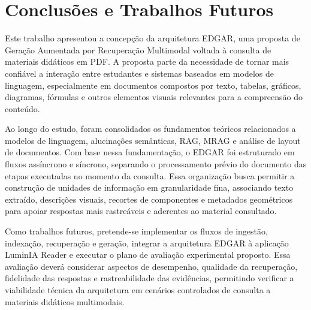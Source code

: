 \chapter{Conclusões e Trabalhos Futuros}
\label{chap:conclusoes-e-trabalhos-futuros}

Este trabalho apresentou a concepção da arquitetura EDGAR, uma proposta de Geração Aumentada por Recuperação Multimodal voltada à consulta de materiais didáticos em PDF. A proposta parte da necessidade de tornar mais confiável a interação entre estudantes e sistemas baseados em modelos de linguagem, especialmente em documentos compostos por texto, tabelas, gráficos, diagramas, fórmulas e outros elementos visuais relevantes para a compreensão do conteúdo.

Ao longo do estudo, foram consolidados os fundamentos teóricos relacionados a modelos de linguagem, alucinações semânticas, RAG, MRAG e análise de layout de documentos. Com base nessa fundamentação, o EDGAR foi estruturado em fluxos assíncrono e síncrono, separando o processamento prévio do documento das etapas executadas no momento da consulta. Essa organização busca permitir a construção de unidades de informação em granularidade fina, associando texto extraído, descrições visuais, recortes de componentes e metadados geométricos para apoiar respostas mais rastreáveis e aderentes ao material consultado.

Como trabalhos futuros, pretende-se implementar os fluxos de ingestão, indexação, recuperação e geração, integrar a arquitetura EDGAR à aplicação LuminIA Reader e executar o plano de avaliação experimental proposto. Essa avaliação deverá considerar aspectos de desempenho, qualidade da recuperação, fidelidade das respostas e rastreabilidade das evidências, permitindo verificar a viabilidade técnica da arquitetura em cenários controlados de consulta a materiais didáticos multimodais.